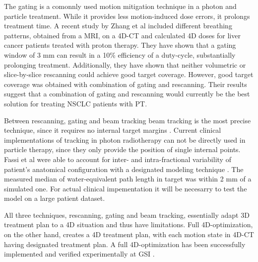 
The gating is a comonnly used motion mitigation technique in a photon and particle treatment. While it provides less motion-induced dose errors, it prolongs treatment time.
A recent study by Zhang et al \cite{Zhang2015} included 
different breathing patterns, obtained from a MRI, on a 4D-CT and calculated 4D doses for liver cancer patients treated with proton therapy. They have shown that a gating window of 3 mm can result
in a 10\% efficiency of a duty-cycle, 
substantially prolonging treatment. Additionally, they have shown that neither volumetric or slice-by-slice rescanning could achieve good target coverage.
However, good target coverage was obtained with combination
of gating and rescanning. Their results suggest that a combination of gating and rescanning would currently be the best solution for treating NSCLC patients with PT.

Between rescanning, gating and beam tracking beam tracking is the most precise technique, since it requires no internal target margins \cite{Bert2011}. 
Current clinical implementations of tracking in photon radiotherapy \cite{Kilby2010, Keall2014} can not be directly used in particle therapy, 
since they only provide the position of single internal points. Fassi et al 
\cite{Fassi2015} were able to account for inter- and intra-fractional variability of patient's anatomical configuration with a designated modeling technique \cite{Fassi2014}.
The measured median of water-equivalent path length in target was within 2 mm of a simulated one. For actual clinical impementation it will be necesarry to test the model
on a large patient dataset.

All three techniques, rescanning, gating and beam tracking, essentially adapt 3D treatment plan to a 4D situation and thus have limitations. Full 4D-optimization, on the other hand,
creates a 4D treatment plan, with each motion state in 4D-CT having designated treatment plan. A full 4D-optimization has been successfully implemented and verified experimentally at
GSI \cite{Graeff2013}.

